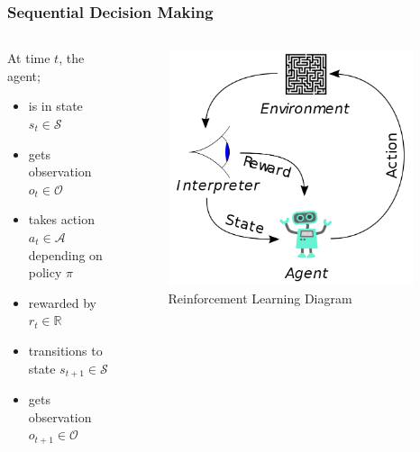 \documentclass{beamer}
\begin{document}
\begin{frame}
\frametitle{Sequential Decision Making}
\begin{columns}[onlytextwidth]
	\begin{column}{.45\textwidth}
		At time $t$, the agent;
		\begin{itemize}
			\item is in state $s_t \in \mathcal{S}$
			\item gets observation $o_t \in \mathcal{O}$
			\item takes action $a_t \in \mathcal{A}$ depending on policy $\pi$
			\item rewarded by $r_t \in \mathbb{R}$
			\item transitions to state $s_{t+1} \in \mathcal{S}$
			\item gets observation $o_{t+1} \in \mathcal{O}$
		\end{itemize}
	\end{column}
	\begin{column}{.45\textwidth}
		\begin{figure}
			\centering
			\includegraphics[width=0.95\textwidth]{figures/ml_theory/RL_diagram.png}
			\caption{Reinforcement Learning Diagram}
			\label{fig:rl_diagram}
		\end{figure}
	\end{column}
\end{columns}
\end{frame}
\end{document}
